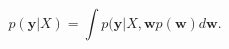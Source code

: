 \begin{equation}
\label{eq:marginallikelihood}
p(\mathbf{y} | X) = \int{p(\mathbf{y} | X, \mathbf{w} p(\mathbf{w}) d
\mathbf{w}}.
\end{equation}
